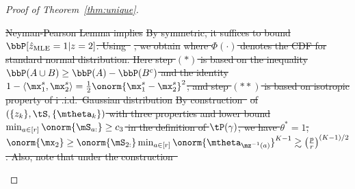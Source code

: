 \documentclass[lettersize,onecolumn,journal]{IEEEtran}
\theoremstyle{definition}
\theoremstyle{definition}
\def\fixme#1#2{\textbf{\color{red}[FIXME (#1): #2]}}
\providecommand{\DIFdeltex}[1]{{\protect\color{red}\sout{#1}}}                      %
\providecommand{\DIFdel}[1]{\texorpdfstring{\DIFdeltex{#1}}{}} %
\begin{document}
\begin{proof}[Proof of Theorem~\ref{thm:unique}]
\begin{enumerate}[wide]
\DIFdel{Neyman-Pearson Lemma implies
}%
\DIFdel{By symmetric, it suffices to bound $\bbP[\hat z_{\text{MLE}}=1|z=2]$. Using~}%
\DIFdel{, we obtain
}%
\DIFdel{where $\Phi(\cdot)$ denotes the CDF for standard normal distribution. Here step $(*)$ is based on the inequality $\bbP(A\cup B)\geq \bbP(A)-\bbP(B^c)$ and the identity $1-\langle \mx^s_1,\mx^s_2 \rangle={1\over 2}\onorm{\mx^s_1-\mx^s_2}^2$; and step $(**)$ is based on isotropic property of i .i.d.\ Gaussian distribution
}%
\DIFdel{By construction~}%
\DIFdel{of $(\{z_k\}, \tS, \{\mtheta_k\})$ with three properties and lower bound $\min_{a\in[r]}\onorm{\mS_{a:}}\geq c_3$ in the definition of $\tP(\gamma)$, we have $\theta^*=1$, $\onorm{\mx_2}\geq \onorm{\mS_{2:}}\min_{a\in[r]}\onorm{\mtheta_{\mz^{-1}(a)}}^{K-1} \gtrsim \left(p \over r\right)^{(K-1)/2}$. Also, note that under the construction~}%

\end{enumerate}
\end{proof}
\end{document}
